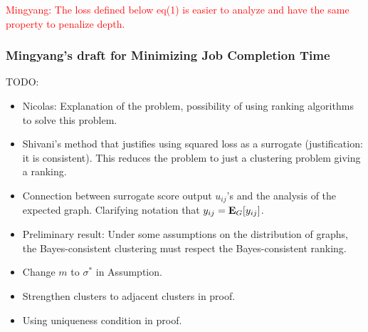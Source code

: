 
\textcolor{red}{Mingyang: The loss defined below eq(1) is easier to analyze and have the same property to penalize depth.}


\subsubsection{Mingyang's draft for Minimizing Job Completion Time}

TODO:
\begin{itemize}
\item Nicolas: Explanation of the problem, possibility of using ranking
  algorithms to solve this problem. 
\item Shivani's method that justifies using squared loss as a surrogate
  (justification: it is consistent). This reduces the problem to just a
  clustering problem giving a ranking.
\item Connection between surrogate score output $u_{ij}$'s and the analysis
  of the expected graph. Clarifying notation that $y_{ij} = {\mathbf E}_G[y_{ij}]$.
\item Preliminary result: Under some assumptions on the distribution of graphs,
  the Bayes-consistent clustering must respect the Bayes-consistent ranking.
\item Change $m$ to $\sigma^*$ in Assumption.
\item Strengthen clusters to adjacent clusters in proof. 
\item Using uniqueness condition in proof. 
\end{itemize}

